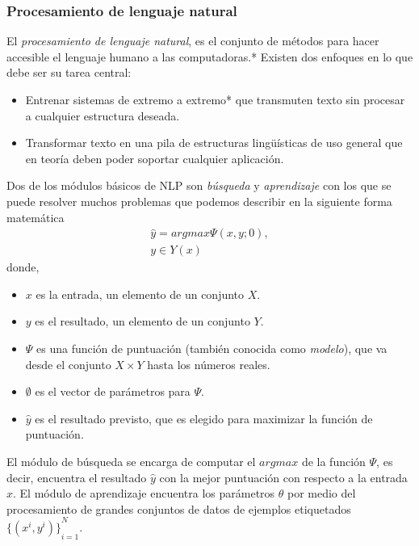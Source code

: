 \subsubsection {Procesamiento de lenguaje natural}\label{subsec:nlp}
El \emph{procesamiento de lenguaje natural}, es el conjunto de métodos para hacer accesible el lenguaje humano a las computadoras\cite{eise19}.* Existen dos enfoques en lo que debe ser su tarea central: 
\begin{itemize}
	\item Entrenar sistemas de extremo a extremo* que transmuten texto sin procesar a cualquier estructura deseada.
	\item Transformar texto en una pila de estructuras lingüísticas de uso general que en teoría deben poder soportar cualquier aplicación.
\end{itemize}
Dos de los módulos básicos de NLP son \emph{búsqueda} y \emph{aprendizaje} con los que se puede resolver muchos problemas que podemos describir en la siguiente forma matemática
\begin{equation}
\begin{matrix}
\hat{y}=argmax\Psi(x,y;0),\\
y\in Y(x)
\end{matrix}
\end{equation}
donde,
\begin{itemize}
	\item $x$ es la entrada, un elemento de un conjunto $X$.
	\item $y$ es el resultado, un elemento de un conjunto $Y$.
	\item $\Psi$ es una función de puntuación (también conocida como \emph{modelo}), que va desde el conjunto $X\times Y$ hasta los números reales.
	\item $\emptyset$ es el vector de parámetros para $\Psi$.
	\item $\hat{y}$ es el resultado previsto, que es elegido para maximizar la función de puntuación.
\end{itemize}
El módulo de búsqueda se encarga de computar el $argmax$ de la función $\Psi$, es decir, encuentra el resultado $\hat{y}$ con la mejor puntuación con respecto a la entrada $x$. El módulo de aprendizaje encuentra los parámetros $\theta$ por medio del procesamiento de grandes conjuntos de datos de ejemplos etiquetados ${\{(x^i,y^i)\}}_{i=1}^{N}$.